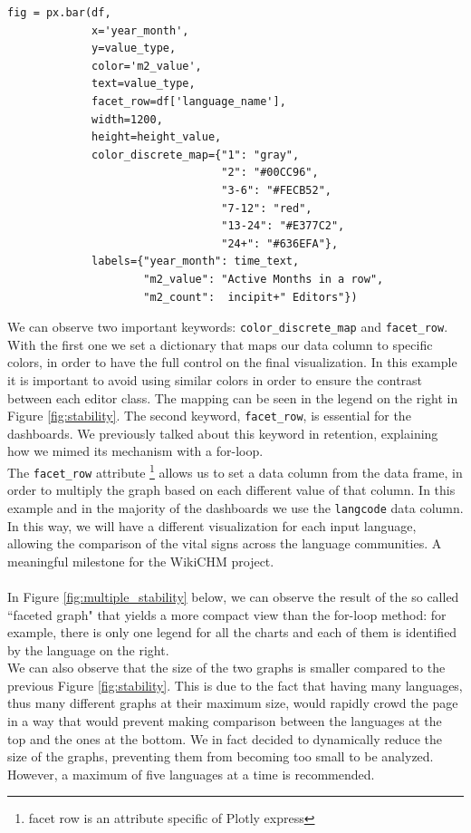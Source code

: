 \lstset{frame=lines}
\lstset{basicstyle=\footnotesize}
\lstset{caption=Creating a stacked bar chart}
\begin{lstlisting}
fig = px.bar(df,
             x='year_month',
             y=value_type,
             color='m2_value',
             text=value_type,
             facet_row=df['language_name'],
             width=1200,
             height=height_value,
             color_discrete_map={"1": "gray",
                                 "2": "#00CC96",
                                 "3-6": "#FECB52",
                                 "7-12": "red",
                                 "13-24": "#E377C2",
                                 "24+": "#636EFA"},
             labels={"year_month": time_text,
                     "m2_value": "Active Months in a row",
                     "m2_count":  incipit+" Editors"})
\end{lstlisting}
We can observe two important keywords: \verb#color_discrete_map# and \verb#facet_row#.
With the first one we set a dictionary that maps our data column to specific colors, in order to have the full control on the final visualization. In this example it is important to avoid using similar colors in order to ensure the contrast between each editor class.
The mapping can be seen in the legend on the right in Figure \ref{fig:stability}.
The second keyword, \verb#facet_row#, is essential for the dashboards. We previously talked about this keyword in retention, explaining how we mimed its mechanism with a for-loop. \\
The \verb#facet_row# attribute \footnote{ facet row is an attribute specific of Plotly express} allows us to set a data column from the data frame, in order to multiply the graph based on each different value of that column. In this example and in the majority of the dashboards we use the \verb#langcode# data column. In this way, we will have a different visualization for each input language, allowing the comparison of the vital signs across the language communities. A meaningful milestone for the WikiCHM project.\\
\\
In Figure \ref{fig:multiple_stability} below, we can observe the result of the
so called ``faceted graph" that yields a more compact view than the for-loop method: for example, there is only one legend for all the charts and each of them is identified by the language on the right.\\
We can also observe that the size of the two graphs is smaller compared to the previous Figure \ref{fig:stability}. This is due to the fact that having many languages, thus many different graphs at their maximum size, would rapidly crowd the page in a way that would prevent making comparison between the languages at the top and the ones at the bottom. We in fact decided to dynamically reduce the size of the graphs, preventing them from becoming too small to be analyzed. However, a maximum of five languages at a time is recommended.

